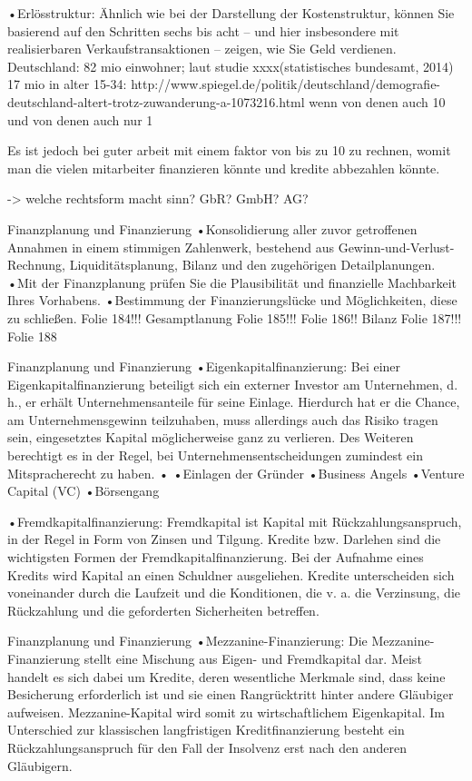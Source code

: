 •Erlösstruktur: Ähnlich wie bei der Darstellung der Kostenstruktur, können Sie basierend auf den Schritten sechs bis acht – und hier insbesondere mit realisierbaren Verkaufstransaktionen – zeigen, wie Sie Geld verdienen.
Deutschland: 82 mio einwohner; laut studie xxxx(statistisches bundesamt, 2014) 17 mio in alter 15-34:
http://www.spiegel.de/politik/deutschland/demografie-deutschland-altert-trotz-zuwanderung-a-1073216.html
wenn von denen auch 10%
und von denen auch nur 1%

Es ist jedoch bei guter arbeit mit einem faktor von bis zu 10 zu rechnen, womit man die vielen mitarbeiter finanzieren könnte und kredite abbezahlen könnte.

 -> welche rechtsform macht sinn? GbR? GmbH? AG?
 

Finanzplanung und Finanzierung
•Konsolidierung aller zuvor getroffenen Annahmen in einem stimmigen Zahlenwerk, bestehend aus Gewinn-und-Verlust-Rechnung, Liquiditätsplanung, Bilanz und den zugehörigen Detailplanungen.
•Mit der Finanzplanung prüfen Sie die Plausibilität und finanzielle Machbarkeit Ihres Vorhabens.
•Bestimmung der Finanzierungslücke und Möglichkeiten, diese zu schließen.
Folie 184!!! Gesamptlanung
Folie 185!!!
Folie 186!!
Bilanz Folie 187!!!
Folie 188


Finanzplanung und Finanzierung
•Eigenkapitalfinanzierung: Bei einer Eigenkapitalfinanzierung beteiligt sich ein externer Investor am Unternehmen, d. h., er erhält Unternehmensanteile für seine Einlage. Hierdurch hat er die Chance, am Unternehmensgewinn teilzuhaben, muss allerdings auch das Risiko tragen sein, eingesetztes Kapital möglicherweise ganz zu verlieren. Des Weiteren berechtigt es in der Regel, bei Unternehmensentscheidungen zumindest ein Mitspracherecht zu haben. •
•Einlagen der Gründer
•Business Angels
•Venture Capital (VC)
•Börsengang

•Fremdkapitalfinanzierung: Fremdkapital ist Kapital mit Rückzahlungsanspruch, in der Regel in Form von Zinsen und Tilgung. Kredite bzw. Darlehen sind die wichtigsten Formen der Fremdkapitalfinanzierung. Bei der Aufnahme eines Kredits wird Kapital an einen Schuldner ausgeliehen. Kredite unterscheiden sich voneinander durch die Laufzeit und die Konditionen, die v. a. die Verzinsung, die Rückzahlung und die geforderten Sicherheiten betreffen.


Finanzplanung und Finanzierung
•Mezzanine-Finanzierung: Die Mezzanine-Finanzierung stellt eine Mischung aus Eigen- und Fremdkapital dar. Meist handelt es sich dabei um Kredite, deren wesentliche Merkmale sind, dass keine Besicherung erforderlich ist und sie einen Rangrücktritt hinter andere Gläubiger aufweisen. Mezzanine-Kapital wird somit zu wirtschaftlichem Eigenkapital. Im Unterschied zur klassischen langfristigen Kreditfinanzierung besteht ein Rückzahlungsanspruch für den Fall der Insolvenz erst nach den anderen Gläubigern.


